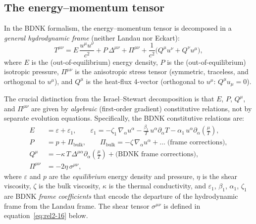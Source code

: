 \subsection{The energy--momentum tensor}\label{sec:rel7a}

In the BDNK formalism, the energy--momentum tensor is decomposed in a
\emph{general hydrodynamic frame} (neither Landau nor Eckart):
\begin{equation}
\label{eq:rel2-7}
  T^{\mu\nu} = E\,\frac{u^\mu u^\nu}{c^2}
    + P\,\Delta^{\mu\nu}
    + \Pi^{\mu\nu}
    + \frac{1}{c^2}\bigl(Q^\mu u^\nu + Q^\nu u^\mu\bigr),
\end{equation}
where $E$ is the (out-of-equilibrium) energy density, $P$ is the
(out-of-equilibrium) isotropic pressure, $\Pi^{\mu\nu}$ is the
anisotropic stress tensor (symmetric, traceless, and orthogonal to
$u^\mu$), and $Q^\mu$ is the heat-flux 4-vector (orthogonal to $u^\mu$:
$Q^\mu u_\mu = 0$).

The crucial distinction from the Israel--Stewart decomposition is that
$E$, $P$, $Q^\mu$, and $\Pi^{\mu\nu}$ are given by \emph{algebraic}
(first-order gradient) constitutive relations, not by separate evolution
equations.  Specifically, the BDNK constitutive relations are:
\begin{align}
\label{eq:rel2-7a}
  E &= \varepsilon + \varepsilon_1, \qquad
  \varepsilon_1 = -\zeta_1\,\nabla_\alpha u^\alpha
    - \frac{\beta_1}{T}\,u^\alpha\partial_\alpha T
    - \alpha_1\,u^\alpha\partial_\alpha\!\left(\frac{\mu}{T}\right), \\[4pt]
\label{eq:rel2-7b}
  P &= p + \Pi_{\mathrm{bulk}}, \qquad
  \Pi_{\mathrm{bulk}} = -\zeta\,\nabla_\alpha u^\alpha + \ldots
    \;\text{(frame corrections)}, \\[4pt]
\label{eq:rel2-7c}
  Q^\mu &= -\kappa\,T\,\Delta^{\mu\alpha}\partial_\alpha\!\left(\frac{\mu}{T}\right)
    + \text{(BDNK frame corrections)}, \\[4pt]
\label{eq:rel2-7d}
  \Pi^{\mu\nu} &= -2\eta\,\sigma^{\mu\nu},
\end{align}
where $\varepsilon$ and $p$ are the \emph{equilibrium} energy density and
pressure, $\eta$ is the shear viscosity, $\zeta$ is the bulk viscosity,
$\kappa$ is the thermal conductivity, and $\varepsilon_1$, $\beta_1$,
$\alpha_1$, $\zeta_1$ are BDNK \emph{frame coefficients} that encode the
departure of the hydrodynamic frame from the Landau frame.  The shear
tensor $\sigma^{\mu\nu}$ is defined in equation~\eqref{eq:rel2-16} below.

